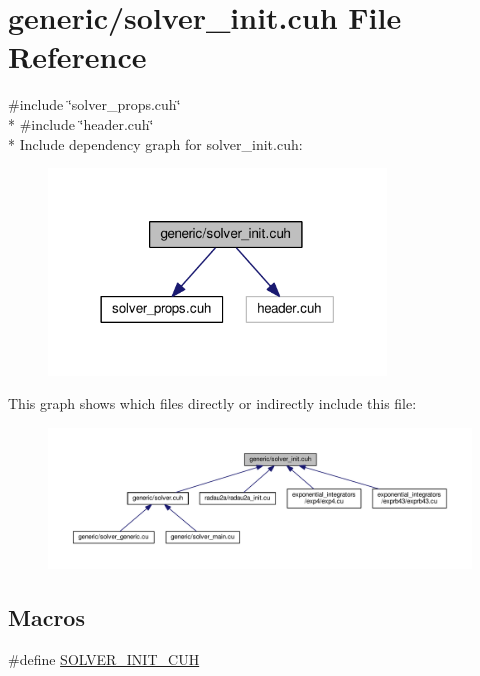 \hypertarget{solver__init_8cuh}{}\section{generic/solver\+\_\+init.cuh File Reference}
\label{solver__init_8cuh}
{\ttfamily \#include \char`\"{}solver\+\_\+props.\+cuh\char`\"{}}\\*
{\ttfamily \#include \char`\"{}header.\+cuh\char`\"{}}\\*
Include dependency graph for solver\+\_\+init.\+cuh\+:\nopagebreak
\begin{figure}[H]
\begin{center}
\leavevmode
\includegraphics[width=254pt]{solver__init_8cuh__incl}
\end{center}
\end{figure}
This graph shows which files directly or indirectly include this file\+:\nopagebreak
\begin{figure}[H]
\begin{center}
\leavevmode
\includegraphics[width=350pt]{solver__init_8cuh__dep__incl}
\end{center}
\end{figure}
\subsection*{Macros}
\begin{DoxyCompactItemize}
\item 
\#define \hyperlink{solver__init_8cuh_a6476a3e2130c9d369a9f7f65aaf5721e}{S\+O\+L\+V\+E\+R\+\_\+\+I\+N\+I\+T\+\_\+\+C\+UH}
\end{DoxyCompactItemize}
